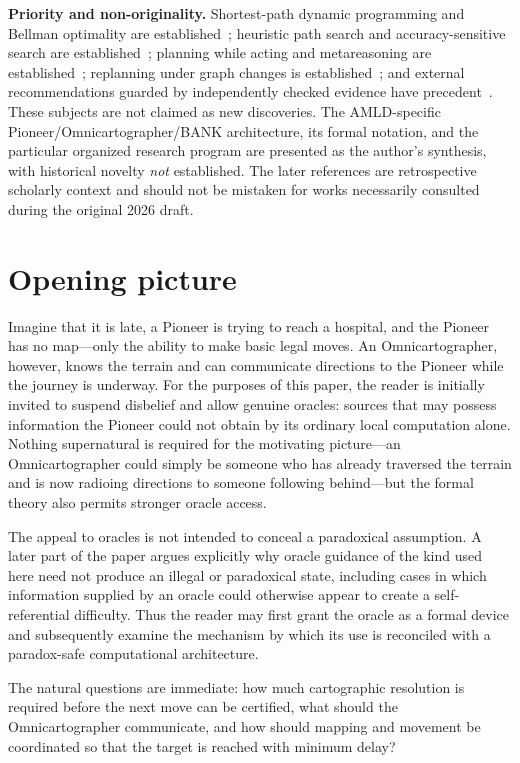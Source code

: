 \documentclass[11pt]{article}
\theoremstyle{definition}
\theoremstyle{remark}
\begin{document}
\noindent\textbf{Priority and non-originality.} Shortest-path dynamic programming and Bellman optimality are established~\cite{bellman}; heuristic path search and accuracy-sensitive search are established~\cite{astar,pearl}; planning while acting and metareasoning are established~\cite{korf,russell}; replanning under graph changes is established~\cite{dstar}; and external recommendations guarded by independently checked evidence have precedent~\cite{necula}. These subjects are not claimed as new discoveries. The AMLD-specific Pioneer/Omnicartographer/BANK architecture, its formal notation, and the particular organized research program are presented as the author's synthesis, with historical novelty \emph{not} established. The later references are retrospective scholarly context and should not be mistaken for works necessarily consulted during the original 2026 draft.


\section*{Opening picture}
Imagine that it is late, a Pioneer is trying to reach a hospital, and the Pioneer has no map---only the ability to make basic legal moves. An Omnicartographer, however, knows the terrain and can communicate directions to the Pioneer while the journey is underway. For the purposes of this paper, the reader is initially invited to suspend disbelief and allow genuine oracles: sources that may possess information the Pioneer could not obtain by its ordinary local computation alone. Nothing supernatural is required for the motivating picture---an Omnicartographer could simply be someone who has already traversed the terrain and is now radioing directions to someone following behind---but the formal theory also permits stronger oracle access.

The appeal to oracles is not intended to conceal a paradoxical assumption. A later part of the paper argues explicitly why oracle guidance of the kind used here need not produce an illegal or paradoxical state, including cases in which information supplied by an oracle could otherwise appear to create a self-referential difficulty. Thus the reader may first grant the oracle as a formal device and subsequently examine the mechanism by which its use is reconciled with a paradox-safe computational architecture.

The natural questions are immediate: how much cartographic resolution is required before the next move can be certified, what should the Omnicartographer communicate, and how should mapping and movement be coordinated so that the target is reached with minimum delay?
\end{document}
